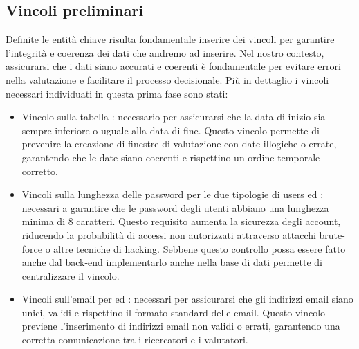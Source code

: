 \documentclass{report}
\begin{document}
\subsection{Vincoli preliminari}
Definite le entità chiave risulta fondamentale inserire dei vincoli per garantire l'integrità e coerenza dei dati che andremo ad inserire. Nel nostro contesto, assicurarsi che i dati siano accurati e coerenti è fondamentale per evitare errori nella valutazione e facilitare il processo decisionale.  Più in dettaglio i vincoli necessari individuati in questa prima fase sono stati:\\
\begin{itemize}
\item Vincolo sulla tabella : necessario per assicurarsi che la data di inizio sia sempre inferiore o uguale alla data di fine. Questo vincolo permette di prevenire la creazione di finestre di valutazione con date illogiche o errate, garantendo che le date siano coerenti e rispettino un ordine temporale corretto.

\item Vincoli sulla lunghezza delle password per le due tipologie di users  ed : necessari a garantire che le password degli utenti abbiano una lunghezza minima di 8 caratteri. Questo requisito aumenta la sicurezza degli account, riducendo la probabilità di accessi non autorizzati attraverso attacchi brute-force o altre tecniche di hacking. Sebbene questo controllo possa essere fatto anche dal back-end implementarlo anche nella base di dati permette di centralizzare il vincolo.

\item Vincoli sull'email per  ed : necessari per assicurarsi che gli indirizzi email siano unici, validi e rispettino il formato standard delle email. Questo vincolo previene l'inserimento di indirizzi email non validi o errati, garantendo una corretta comunicazione tra i ricercatori e i valutatori. 
    \end{itemize}
\end{document}
